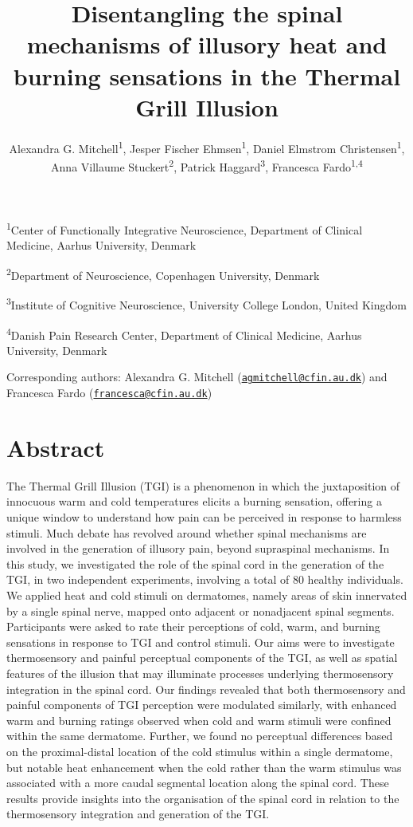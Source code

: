 \documentclass[
]{article}
\title{Disentangling the spinal mechanisms of illusory heat and burning
sensations in the Thermal Grill Illusion}
\author{Alexandra G. Mitchell\textsuperscript{1}, Jesper Fischer
Ehmsen\textsuperscript{1}, Daniel Elmstrom
Christensen\textsuperscript{1}, Anna Villaume
Stuckert\textsuperscript{2}, Patrick Haggard\textsuperscript{3},
Francesca Fardo\textsuperscript{1,4}}
\date{}
\begin{document}
\maketitle

\textsuperscript{1}Center of Functionally Integrative Neuroscience,
Department of Clinical Medicine, Aarhus University, Denmark

\textsuperscript{2}Department of Neuroscience, Copenhagen University,
Denmark

\textsuperscript{3}Institute of Cognitive Neuroscience, University
College London, United Kingdom

\textsuperscript{4}Danish Pain Research Center, Department of Clinical
Medicine, Aarhus University, Denmark

Corresponding authors: Alexandra G. Mitchell
(\href{mailto:agmitchell@cfin.au.dk}{\nolinkurl{agmitchell@cfin.au.dk}})
and Francesca Fardo
(\href{mailto:francesca@cfin.au.dk}{\nolinkurl{francesca@cfin.au.dk}})

\hypertarget{abstract}{%
\section{Abstract}\label{abstract}}

The Thermal Grill Illusion (TGI) is a phenomenon in which the
juxtaposition of innocuous warm and cold temperatures elicits a burning
sensation, offering a unique window to understand how pain can be
perceived in response to harmless stimuli. Much debate has revolved
around whether spinal mechanisms are involved in the generation of
illusory pain, beyond supraspinal mechanisms. In this study, we
investigated the role of the spinal cord in the generation of the TGI,
in two independent experiments, involving a total of 80 healthy
individuals. We applied heat and cold stimuli on dermatomes, namely
areas of skin innervated by a single spinal nerve, mapped onto adjacent
or nonadjacent spinal segments. Participants were asked to rate their
perceptions of cold, warm, and burning sensations in response to TGI and
control stimuli. Our aims were to investigate thermosensory and painful
perceptual components of the TGI, as well as spatial features of the
illusion that may illuminate processes underlying thermosensory
integration in the spinal cord. Our findings revealed that both
thermosensory and painful components of TGI perception were modulated
similarly, with enhanced warm and burning ratings observed when cold and
warm stimuli were confined within the same dermatome. Further, we found
no perceptual differences based on the proximal-distal location of the
cold stimulus within a single dermatome, but notable heat enhancement
when the cold rather than the warm stimulus was associated with a more
caudal segmental location along the spinal cord. These results provide
insights into the organisation of the spinal cord in relation to the
thermosensory integration and generation of the TGI.
\end{document}
